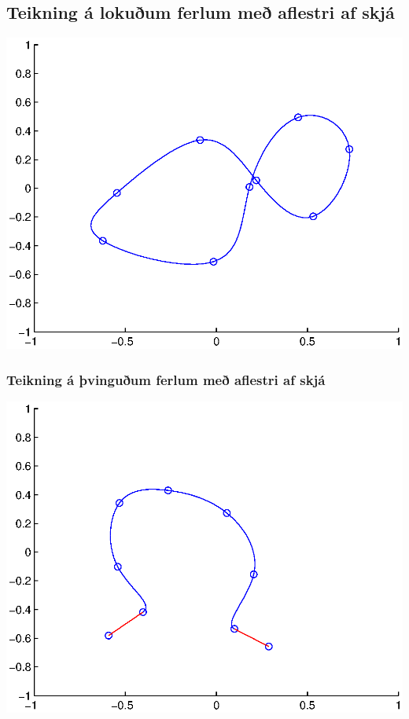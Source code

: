 \documentclass[a4]{article}
\begin{document}
\subsection{Teikning á lokuðum ferlum með aflestri af skjá}
\includegraphics[height=0.495\textheight]{Ss1.eps}\\
\subsubsection{Teikning á þvinguðum ferlum með aflestri af skjá }

\includegraphics[height=0.495\textheight]{Ss2.eps}\\
\end{document}
